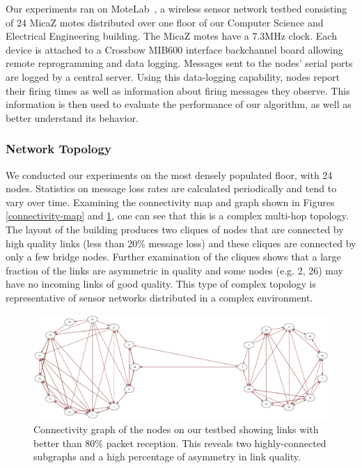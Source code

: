 Our experiments ran on MoteLab~\cite{motelab-spots05-abbrv}, a
wireless sensor network testbed consisting of 24 MicaZ motes
distributed over one floor of our Computer Science and Electrical
Engineering building. The MicaZ motes have a 7.3MHz clock. Each device
is attached to a Crossbow MIB600 interface backchannel board allowing
remote reprogramming and data logging. Messages sent to the nodes'
serial ports are logged by a central server. Using this data-logging
capability, nodes report their firing times as well as information
about firing messages they observe. This information is then used to
evaluate the performance of our algorithm, as well as better
understand its behavior.

\subsubsection{Network Topology}
\label{sec-FTSP}
We conducted our experiments on the most densely populated floor, with
24 nodes. Statistics on message loss rates are calculated periodically
and tend to vary over time. Examining the connectivity map and graph
shown in Figures \ref{connectivity-map} and \ref{connectivity-graph},
one can see that this is a complex multi-hop topology. The layout of
the building produces two cliques of nodes that are connected by high
quality links (less than 20\% message loss) and these cliques are
connected by only a few bridge nodes. Further examination of the
cliques shows that a large fraction of the links are asymmetric in
quality and some nodes (e.g. 2, 26) may have no incoming links of good
quality. This type of complex topology is representative of sensor
networks distributed in a complex environment.



\begin{figure}[t]
\begin{center}
\includegraphics[width=0.8\hsize]{figures/threshold-motelab-0200-e.pdf}
\end{center}
\caption{Connectivity graph of the nodes on our testbed showing links
with better than 80\% packet reception. This reveals two
highly-connected subgraphs and a high percentage of asymmetry in link
quality.}
\label{connectivity-graph}
\end{figure}




